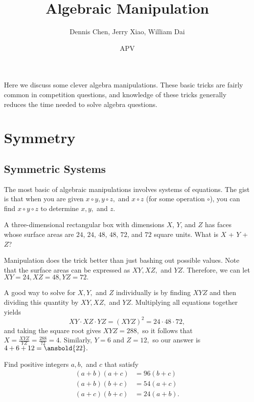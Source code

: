 \documentclass[mast]{lucky}
\title{Algebraic Manipulation}
\author{Dennis Chen, Jerry Xiao, William Dai}
\date{APV}
\begin{document}
\maketitle

Here we discuss some clever algebra manipulations. These basic tricks are fairly common in competition questions, and knowledge of these tricks generally reduces the time needed to solve algebra questions.

\section{Symmetry}
\subsection{Symmetric Systems}

The most basic of algebraic manipulations involves systems of equations. The gist is that when you are given $x\circ y,y\circ z,$ and $x\circ z$ (for some operation $\circ$), you can find $x \circ y \circ z$ to determine $x,y,$ and $z.$
\begin{exam}[2018 AMC 10B/4]
A three-dimensional rectangular box with dimensions $X$, $Y$, and $Z$ has faces whose surface areas are $24$, $24$, $48$, $48$, $72$, and $72$ square units. What is $X$ + $Y$ + $Z$?
\end{exam}
\begin{sol}
Manipulation does the trick better than just bashing out possible values. Note that the surface areas can be expressed as $XY,XZ,$ and $YZ.$ Therefore, we can let $XY = 24, XZ = 48, YZ = 72.$

A good way to solve for $X,Y,$ and $Z$ individually is by finding $XYZ$ and then dividing this quantity by $XY, XZ,$ and $YZ.$ Multiplying all equations together yields
\[XY \cdot XZ \cdot YZ = (XYZ)^2 = 24 \cdot 48 \cdot 72,\]
and taking the square root gives $XYZ = 288,$ so it follows that $X = \frac{XYZ}{YZ} = \frac{288}{72} = 4.$ Similarly, $Y = 6$ and $Z=12,$ so our answer is $4+6+12=\ansbold{22}.$
\end{sol}
\begin{exam}[Classic]
Find positive integers $a,b,$ and $c$ that satisfy
\begin{align*}
(a+b)(a+c)&=96(b+c) \\
(a+b)(b+c)&=54(a+c) \\
(a+c)(b+c)&=24(a+b).
\end{align*}
\end{exam}
\end{document}
